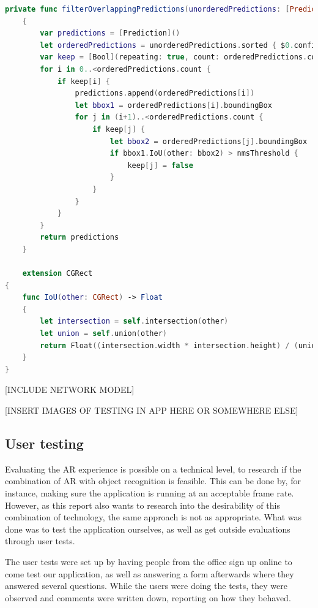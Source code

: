 \begin{lstlisting}[language=swift]
    private func filterOverlappingPredictions(unorderedPredictions: [Prediction], nmsThreshold: Float) -> [Prediction]
    {
        var predictions = [Prediction]()
        let orderedPredictions = unorderedPredictions.sorted { $0.confidence > $1.confidence }
        var keep = [Bool](repeating: true, count: orderedPredictions.count)
        for i in 0..<orderedPredictions.count {
            if keep[i] {
                predictions.append(orderedPredictions[i])
                let bbox1 = orderedPredictions[i].boundingBox
                for j in (i+1)..<orderedPredictions.count {
                    if keep[j] {
                        let bbox2 = orderedPredictions[j].boundingBox
                        if bbox1.IoU(other: bbox2) > nmsThreshold {
                            keep[j] = false
                        }
                    }
                }
            }
        }
        return predictions
    }
    
    extension CGRect
{
    func IoU(other: CGRect) -> Float
    {
        let intersection = self.intersection(other)
        let union = self.union(other)
        return Float((intersection.width * intersection.height) / (union.width * union.height))
    }
}
\end{lstlisting}



[INCLUDE NETWORK MODEL]

 [INSERT IMAGES OF TESTING IN APP HERE  OR SOMEWHERE ELSE] 

\subsection{User testing}
Evaluating the AR experience is possible on a technical level, to research if the 
combination of AR with object recognition is feasible. This can be done by, for instance,  
making sure the application is running at an acceptable frame rate. However, as this 
report also wants to research into the desirability of this combination of technology, the 
same approach is not as appropriate. What was done was to test the 
application ourselves, as well as get outside evaluations through user tests.

The user tests were set up by having people from the office sign up online to come test our 
application, as well as answering a form afterwards where they answered several 
questions. While the users were doing the tests, they were observed and comments were 
written down, reporting on how they behaved. 

